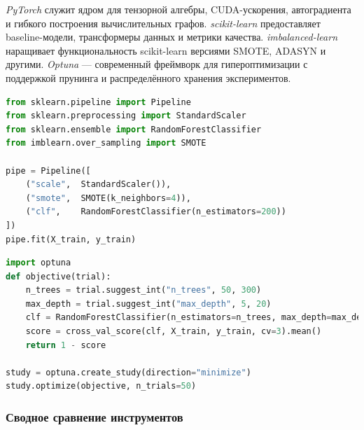 \emph{PyTorch} служит ядром для тензорной алгебры, CUDA-ускорения,
автоградиента и гибкого построения вычислительных графов.
\emph{scikit-learn} предоставляет baseline-модели, трансформеры данных
и метрики качества.  
\emph{imbalanced-learn} наращивает функциональность scikit-learn 
версиями SMOTE, ADASYN и другими.  
\emph{Optuna} — современный фреймворк для гипероптимизации
с поддержкой прунинга и распределённого хранения экспериментов.

\begin{lstlisting}[language=Python, caption={Пример Pipeline с SMOTE и RandomForest}, label={lst:pipeline}]
from sklearn.pipeline import Pipeline
from sklearn.preprocessing import StandardScaler
from sklearn.ensemble import RandomForestClassifier
from imblearn.over_sampling import SMOTE

pipe = Pipeline([
    ("scale",  StandardScaler()),
    ("smote",  SMOTE(k_neighbors=4)),
    ("clf",    RandomForestClassifier(n_estimators=200))
])
pipe.fit(X_train, y_train)
\end{lstlisting}

\begin{lstlisting}[language=Python, caption={Optuna-оптимизация параметров модели}, label={lst:optuna_example}]
import optuna
def objective(trial):
    n_trees = trial.suggest_int("n_trees", 50, 300)
    max_depth = trial.suggest_int("max_depth", 5, 20)
    clf = RandomForestClassifier(n_estimators=n_trees, max_depth=max_depth)
    score = cross_val_score(clf, X_train, y_train, cv=3).mean()
    return 1 - score

study = optuna.create_study(direction="minimize")
study.optimize(objective, n_trials=50)
\end{lstlisting}

\subsubsection{Сводное сравнение инструментов}
\label{subsubsec:tool_choice}

